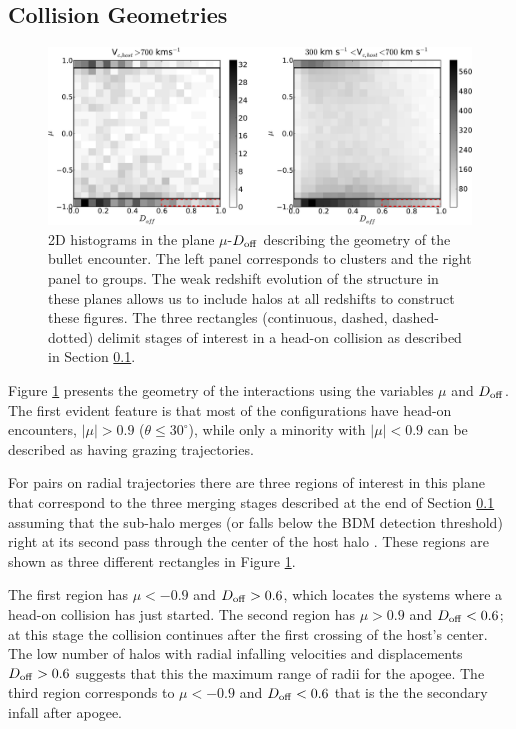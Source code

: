 \documentclass{emulateapj}
\begin{document}
\subsection{Collision Geometries}
\label{sec:geometry}

\begin{figure}
\begin{center}
\includegraphics[width=1.0\textwidth]{figure_2.pdf}
\end{center}
\caption{2D histograms in the plane $\mu$-$D_{\rm off}$ describing the
  geometry of the bullet encounter. The left
  panel corresponds to clusters and the right panel to groups. 
  The weak redshift evolution of the structure in these planes
  allows us to include halos at all redshifts to construct these figures.
  The three rectangles (continuous, dashed, dashed-dotted)
  delimit stages of interest in a head-on collision as described in
  Section \ref{sec:geometry}.}
\label{fig:geometry}
\end{figure}

Figure \ref{fig:geometry} presents the geometry of the interactions using the 
variables $\mu$ and $D_{\rm off}$. The first evident feature is that
most of the configurations have head-on encounters, $|\mu|>0.9$
($\theta\leq 30^{\circ}$), while only a minority with $|\mu|<0.9$ can
be described as having  grazing trajectories. 

For pairs on radial trajectories there are three regions of interest
in this plane that correspond to the three merging stages described
at the end of Section \ref{sec:geometry} assuming that the sub-halo
merges (or falls below the BDM detection threshold) right at its
second pass through the center of the host halo \citep{Poole2006}.
These regions are shown as three different rectangles in Figure
\ref{fig:geometry}. 

The first region has $\mu<-0.9$ and $D_{\rm off}>0.6$, which
locates the systems where a head-on collision has just started. The
second region has $\mu>0.9$ and $D_{\rm off}<0.6$; at this stage
the collision continues after the first crossing of the host's
center. The low number of halos with radial infalling velocities and
displacements $D_{\rm off}>0.6$ suggests that this the maximum range of
radii for the apogee.  The third region corresponds to $\mu<-0.9$
and $D_{\rm off}<0.6$ that is the the secondary infall after apogee.  
\end{document}
